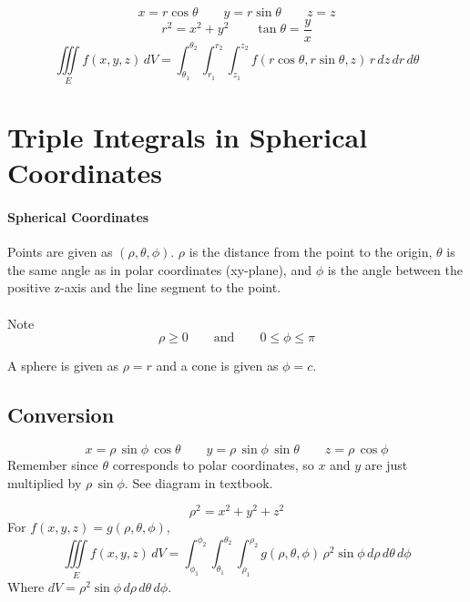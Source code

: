 \documentclass{report}  %
\begin{document}
\begin{equation}
	x = r \cos{\theta} \qquad y = r\sin{\theta} \qquad z = z
\end{equation}
\begin{equation}
	r^2 = x^2 + y^2 \qquad \tan{\theta} = \frac{y}{x}
\end{equation}
\begin{equation}
	\iiint \limits_E f(x, y, z) \, dV = \int_{\theta_1}^{\theta_2} \! \int_{r_1}^{r_2} \! \int_{z_1}^{z_2}
	f(r \cos{\theta}, r\sin{\theta}, z) \, r \, dz \, dr \, d\theta
\end{equation}

\section{Triple Integrals in Spherical Coordinates}
\paragraph{Spherical Coordinates} Points are given as $(\rho, \theta, \phi)$. 
$\rho$ is the distance from the point to the origin, 
$\theta$ is the same angle as in polar coordinates (xy-plane), and
$\phi$ is the angle between the positive z-axis and the line segment to the point. \\ \\
Note $$\rho \ge 0 \qquad \text{and} \qquad 0 \le \phi \le \pi$$

A sphere is given as $\rho = r$ and a cone is given as $\phi = c$. 

\subsection*{Conversion}
\begin{equation}
	x = \rho \, \sin{\phi} \, \cos{\theta} \qquad
	y = \rho \, \sin{\phi} \, \sin{\theta} \qquad
	z = \rho \, \cos{\phi} 
\end{equation}
Remember since $\theta$ corresponds to polar coordinates, so $x$ and $y$ are just multiplied by $\rho \, \sin{\phi}$. 
See diagram in textbook.

\begin{equation}
	\rho^2 = x^2 + y^2 + z^2
\end{equation}
For $f(x, y, z) = g(\rho, \theta, \phi)$,
\begin{equation}
	\iiint \limits_E f(x, y, z) \, dV = 
	\int_{\phi_1}^{\phi_2} \! \int_{\theta_1}^{\theta_2} \! \int_{\rho_1}^{\rho_2} 
	g(\rho, \theta, \phi) \, \rho^2 \sin{\phi} \, d\rho \, d\theta \, d\phi
\end{equation}
Where $dV = \rho^2 \sin{\phi} \, d\rho \, d\theta \, d\phi$.
\end{document}

